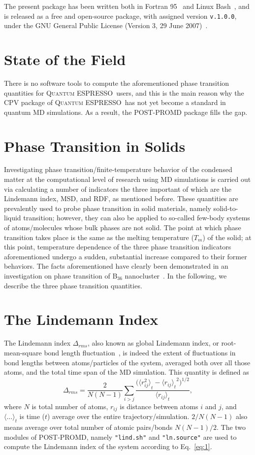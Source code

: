 \documentclass[11pt]{article}
\def\qe{\textsc{Quantum ESPRESSO}}
\begin{document}
The present package has been written both in Fortran 95~\cite{frt} and Linux Bash~\cite{lnx,bsh}, and is released as a free and open-source package, with assigned version {\texttt{v.1.0.0}}, under the GNU General Public License (Version 3, 29 June 2007)~\cite{gg}.
\section*{State of the Field}
There is no software tools to compute the aforementioned phase transition quantities for \qe\ users, and this is the main reason why the CPV package of \qe\ has not yet become a standard in quantum MD simulations. As a result, the POST-PROMD package fills the gap.
\section*{\label{sec:phase}Phase Transition in Solids}
Investigating phase transition/finite-temperature behavior of the condensed matter at the computational level of research using MD simulations is carried out via calculating a number of indicators the three important of which are the Lindemann index, MSD, and RDF, as mentioned before. These quantities are prevalently used to probe phase transition in solid materials, namely solid-to-liquid transition; however, they can also be applied to so-called few-body systems of atoms/molecules whose bulk phases are not solid. The point at which phase transition takes place is the same as the melting temperature ($T_m$) of the solid; at this point, temperature dependence of the three phase transition indicators aforementioned undergo a sudden, substantial increase compared to their former behaviors. The facts aforementioned have clearly been demonstrated in an investigation on phase transition of B$_{36}$ nanocluster~\cite{b36}. In the following, we describe the three phase transition quantities.
\section*{\label{sec:lind}The Lindemann Index}
The Lindemann index $\Delta_{rms}$, also known as global Lindemann index, or root-mean-square bond length fluctuation~\cite{lind}, is indeed the extent of fluctuations in bond lengths between atoms/particles of the system, averaged both over all those atoms, and the total time span of the MD simulation. This quantity is defined as
\vspace{0.01mm}
\begin{equation}
	\label{eq:1}
	\Delta_{rms} = \frac{2}{N(N-1)}\sum_{i>j}\frac{\bigg({\langle{r_{ij}^2}\rangle}_{t}-{{\langle{r_{ij}}\rangle}_{t}}^2\bigg)^{1/2}}{{\langle{r_{ij}}\rangle}_{t}},
\end{equation}
where $N$ is total number of atoms, $r_{ij}$ is distance between atoms $i$ and $j$, and $\langle{...}\rangle_{t}$ is time ($t$) average over the entire trajectory/simulation. $2/N(N-1)$ also means average over total number of atomic pairs/bonds $N(N-1)/2$.
\vspace{0.5mm}
The two modules of POST-PROMD, namely {\texttt{"lind.sh"}} and {\texttt{"ln.source"}} are used to compute the Lindemann index of the system according to Eq.~\ref{eq:1}.
\end{document}
